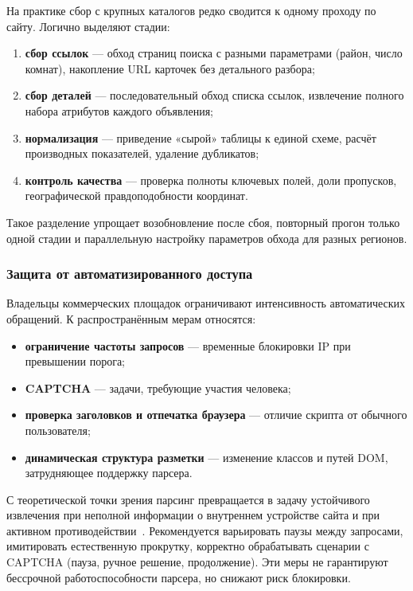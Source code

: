 На практике сбор с крупных каталогов редко сводится к одному проходу по сайту. Логично выделяют стадии:
\begin{enumerate}
    \item \textbf{сбор ссылок} --- обход страниц поиска с разными параметрами (район, число комнат), накопление URL карточек без детального разбора;
    \item \textbf{сбор деталей} --- последовательный обход списка ссылок, извлечение полного набора атрибутов каждого объявления;
    \item \textbf{нормализация} --- приведение «сырой» таблицы к единой схеме, расчёт производных показателей, удаление дубликатов;
    \item \textbf{контроль качества} --- проверка полноты ключевых полей, доли пропусков, географической правдоподобности координат.
\end{enumerate}
Такое разделение упрощает возобновление после сбоя, повторный прогон только одной стадии и параллельную настройку параметров обхода для разных регионов.

\subsubsection{Защита от автоматизированного доступа}

Владельцы коммерческих площадок ограничивают интенсивность автоматических обращений. К распространённым мерам относятся:
\begin{itemize}
    \item \textbf{ограничение частоты запросов} --- временные блокировки IP при превышении порога;
    \item \textbf{CAPTCHA} --- задачи, требующие участия человека;
    \item \textbf{проверка заголовков и отпечатка браузера} --- отличие скрипта от обычного пользователя;
    \item \textbf{динамическая структура разметки} --- изменение классов и путей DOM, затрудняющее поддержку парсера.
\end{itemize}
С теоретической точки зрения парсинг превращается в задачу устойчивого извлечения при неполной информации о внутреннем устройстве сайта и при активном противодействии~\cite{nesterov2024}. Рекомендуется варьировать паузы между запросами, имитировать естественную прокрутку, корректно обрабатывать сценарии с CAPTCHA (пауза, ручное решение, продолжение). Эти меры не гарантируют бессрочной работоспособности парсера, но снижают риск блокировки.

